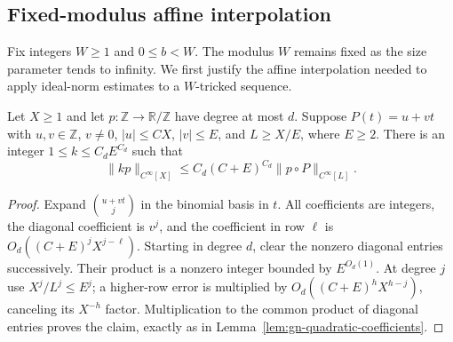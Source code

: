 \subsection{Fixed-modulus affine interpolation}
\label{sec:ga-affine}

Fix integers $W\geq1$ and $0\leq b<W$. The modulus $W$ remains fixed
as the size parameter tends to infinity. We first justify the affine
interpolation needed to apply ideal-norm estimates to a $W$-tricked
sequence.

\begin{lemma}\label{lem:ga-linear-coefficients}
Let $X\geq1$ and let $p:\mathbb Z\to\mathbb R/\mathbb Z$ have degree at most $d$.
Suppose $P(t)=u+vt$ with $u,v\in\mathbb Z$, $v\ne0$,
$|u|\leq C X$, $|v|\leq E$, and $L\geq X/E$, where $E\geq2$.
There is an integer $1\leq k\leq C_dE^{C_d}$ such that
\[
 \|kp\|_{C^\infty[X]}
 \leq C_d(C+E)^{C_d}\|p\circ P\|_{C^\infty[L]}.
\]
\end{lemma}
\begin{proof}
Expand $\binom{u+vt}j$ in the binomial basis in $t$. All coefficients
are integers, the diagonal coefficient is $v^j$, and the coefficient in
row $\ell$ is $O_d((C+E)^jX^{j-\ell})$. Starting in degree $d$, clear
the nonzero diagonal entries successively. Their product is a nonzero
integer bounded by $E^{O_d(1)}$. At degree $j$ use
$X^j/L^j\leq E^j$; a higher-row error is multiplied by
$O_d((C+E)^hX^{h-j})$, canceling its $X^{-h}$ factor. Multiplication
to the common product of diagonal entries proves the claim, exactly
as in Lemma~\ref{lem:gn-quadratic-coefficients}.
\end{proof}

